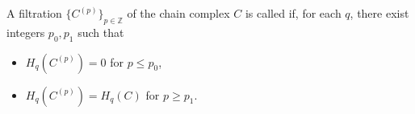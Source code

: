 A filtration $\{C^{(p)}\}_{p \in \mathbb{Z}}$ of the chain complex $C$ is called  if, for each $q$, there exist integers $p_0, p_1$ such that
\begin{itemize}
\item[(i)] $H_q(C^{(p)}) = 0$ for $p \leq p_0$,
\item[(ii)] $H_q(C^{(p)}) = H_q(C)$ for $p \geq p_1$.
\end{itemize}
